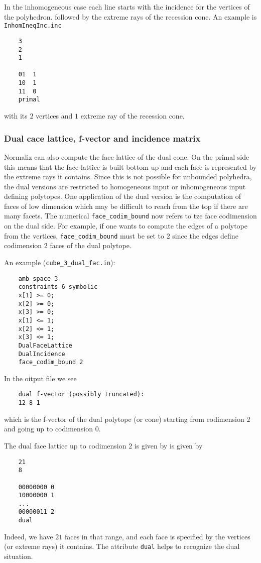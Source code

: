 \documentclass[12pt,a4paper]{scrartcl}
\theoremstyle{definition}
\begin{document}
{	In the inhomogeneous case each line starts with the incidence for the vertices of the polyhedron. followed by the extreme rays of the recession cone. An example is \verb|InhomIneqInc.inc|
	\begin{Verbatim}
	3
	2
	1
	
	01  1
	10  1
	11  0
	primal
	\end{Verbatim}
	with its $2$ vertices and $1$ extreme ray of the recession cone. 
	
	\subsubsection{Dual cace lattice, f-vector and incidence matrix}
	
	Normaliz can also compute the face lattice of the dual cone. On the primal side this means that the face lattice is built bottom up and each face is represented by the extreme rays it contains. Since this is not possible for unbounded polyhedra, the dual versions are restricted to homogeneous input or inhomogeneous input defining polytopes. One application of the dual version is the computation of faces of  low dimension which may be difficult to reach from the top if there are many facets. The numerical \verb|face_codim_bound| now refers to tze face codimension on the dual side. For example, if one wants to compute the edges of a polytope from the vertices, \verb|face_codim_bound| must be set to $2$ since the edges define codimension $2$ faces of the dual polytope.
	
	An example (\verb|cube_3_dual_fac.in|):
	\begin{Verbatim}
	amb_space 3
	constraints 6 symbolic
	x[1] >= 0;
	x[2] >= 0;
	x[3] >= 0;
	x[1] <= 1;
	x[2] <= 1;
	x[3] <= 1;
	DualFaceLattice
	DualIncidence
	face_codim_bound 2
	\end{Verbatim}
	
	In the oitput file we see
	\begin{Verbatim}
	dual f-vector (possibly truncated):
	12 8 1
	\end{Verbatim}
	which is the f-vector of the dual polytope (or cone) starting from codimension $2$ and going up to codimension $0$.
	
	The dual face lattice up to codimension $2$ is given by is given by
	\begin{Verbatim}
	21
	8
	
	00000000 0
	10000000 1
	...
	00000011 2
	dual
	\end{Verbatim}
	Indeed, we have $21$ faces in that range, and each face is specified by the vertices (or extreme rays) it contains. The attribute \verb|dual| helps to recognize the dual situation.
	
}
\end{document}
